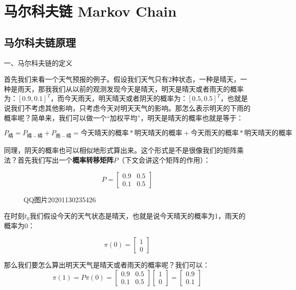\section{马尔科夫链 Markov Chain}

\subsection{马尔科夫链原理}

{一、马尔科夫链的定义}

首先我们来看一个天气预报的例子。假设我们天气只有2种状态，一种是晴天，一种是雨天，那我我们从以前的观测发现今天是晴天，明天是晴天或者雨天的概率为：\([0.9,0.1]^T\)，而今天雨天，明天晴天或者阴天的概率为：\([0.5,0.5]^T\)，也就是说我们不考虑其他影响，只考虑今天对明天天气的影响。那怎么表示明天的下雨的概率呢？简单来，我们可以做一个``加权平均''，明天是晴天的概率也就是等于：

\[P_{晴}=P_{晴-晴}+P_{雨-晴}=今天晴天的概率*明天晴天的概率+今天雨天的概率*明天晴天的概率\]

同理，阴天的概率也可以相似地形式算出来。这个形式是不是很像我们的矩阵乘法？首先我们写出一个\textbf{概率转移矩阵\(P\)}（下文会讲这个矩阵的作用）：

\begin{equation}
  P = 
\begin{bmatrix} 
0.9 &0.5\\0.1 & 0.5
\end{bmatrix} 
\end{equation}


\begin{figure}
\centering
\caption{QQ图片20201130235426}
\end{figure}

在时刻\(t_0\)我们假设今天的天气状态是晴天，也就是说今天晴天的概率为1，雨天的概率为0：

\begin{equation}
  \pi (0)=
\begin{bmatrix} 
1\\0
\end{bmatrix} 
\end{equation}


那么我们要怎么算出明天天气是晴天或者雨天的概率呢？我们可以：
\begin{equation}
  \pi(1)  = P\pi(0) =
    \begin{bmatrix} 
    0.9 &0.5\\0.1 & 0.5
    \end{bmatrix} 
    \begin{bmatrix} 
    1\\0
    \end{bmatrix} 
    =
    \begin{bmatrix} 
    0.9\\0.1
    \end{bmatrix}
\end{equation}


